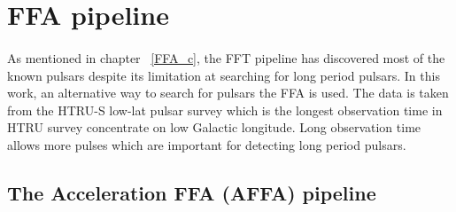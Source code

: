 \documentclass[../chapter1/thesis_msc.tex]{subfiles}
\begin{document}
\section{FFA pipeline}
\paragraph{} As mentioned in chapter ~\ref{FFA_c}, the FFT pipeline has discovered most of the known pulsars despite its limitation at searching for long period pulsars. In this work, an alternative way to search for pulsars the FFA is used. The data is taken from the HTRU-S low-lat pulsar survey which is the longest observation time in HTRU survey concentrate on low Galactic longitude. Long observation time allows more pulses which are important for detecting long period pulsars.  
\subsection{The Acceleration FFA (AFFA) pipeline}
\end{document}
